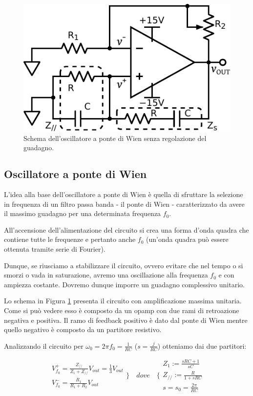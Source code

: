\begin{figure}
\centering
\includegraphics[width=.35\textwidth]{../E08/latex/osc.pdf}
\caption{Schema dell'oscillatore a ponte di Wien senza regolazione del guadagno.}
\label{cir8:without_lamp}
\end{figure}

\subsection{Oscillatore a ponte di Wien}

L'idea alla base dell'oscillatore a ponte di Wien è quella di sfruttare la selezione in frequenza di un filtro passa banda - il ponte di Wien - caratterizzato da avere il massimo guadagno per una determinata frequenza $f_0$.

All'accensione dell'alimentazione del circuito si crea una forma d'onda quadra che contiene tutte le frequenze e pertanto anche $f_0$ (un'onda quadra può essere ottenuta tramite serie di Fourier).

Dunque, se riusciamo a stabilizzare il circuito, ovvero evitare che nel tempo o si smorzi o vada in saturazione, avremo una oscillazione alla frequenza $f_0$ e con ampiezza costante. Dovremo dunque imporre un guadagno complessivo unitario.



Lo schema in Figura \ref{cir8:without_lamp} presenta il circuito con amplificazione massima unitaria.
Come si può vedere esso è composto da un opamp con due rami di retroazione negativa e positiva.
Il ramo di feedback positivo è dato dal ponte di Wien mentre quello negativo è composto da un partitore resistivo.

Analizzando il circuito per $\omega_0=2\pi f_0=\frac{1}{RC}$ ($s=\frac{j}{RC}$) otteniamo dai due partitori:

\begin{equation}
  \begin{array}{lr}
	V^+_{f_0} = \frac{Z_{//}}{Z_1 + Z_{//}}V_{out} = \frac{1}{3}V_{out}\\
	V^-_{f_0} = \frac{R_1}{R_1+R_2}V_{out}
  \end{array} \bigg\}
\quad dove \quad %
\Bigg\{
  \begin{array}{lr}
	Z_1 := \frac{sRC+1}{sC}\\
	Z_{//} := \frac{R}{1+sRC}\\
	s = s_0 = \frac{2\pi}{RC}
  \end{array}
\end{equation}

